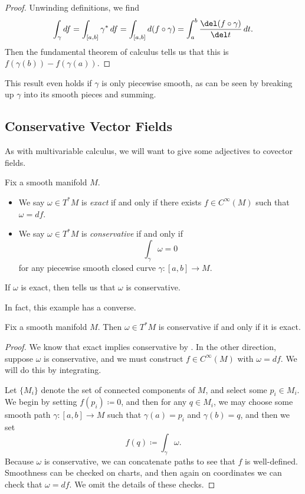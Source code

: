 \documentclass[../notes.tex]{subfiles}
\begin{document}
\begin{proof}
	Unwinding definitions, we find
	\[\int_\gamma df=\int_{[a,b]}\gamma^*\,df=\int_{[a,b]}d(f\circ\gamma)=\int_a^b\frac{\del(f\circ\gamma)}{\del t}\,dt.\]
	Then the fundamental theorem of calculus tells us that this is $f(\gamma(b))-f(\gamma(a))$.
\end{proof}
\begin{remark}
	This result even holds if $\gamma$ is only piecewise smooth, as can be seen by breaking up $\gamma$ into its smooth pieces and summing.
\end{remark}

\subsection{Conservative Vector Fields}
As with multivariable calculus, we will want to give some adjectives to covector fields.
\begin{defihelper}  
	Fix a smooth manifold $M$.
	\begin{itemize}
		\item We say $\omega\in T^*M$ is \textit{exact} if and only if there exists $f\in C^\infty(M)$ such that $\omega=df$.
		\item We say $\omega\in T^*M$ is \textit{conservative} if and only if
		\[\int_\gamma\omega=0\]
		for any piecewise smooth closed curve $\gamma\colon[a,b]\to M$.
	\end{itemize}
\end{defihelper}
\begin{example}
	If $\omega$ is exact, then  tells us that $\omega$ is conservative.
\end{example}
In fact, this example has a converse.
\begin{proposition}
	Fix a smooth manifold $M$. Then $\omega\in T^*M$ is conservative if and only if it is exact.
\end{proposition}
\begin{proof}
	We know that exact implies conservative by . In the other direction, suppose $\omega$ is conservative, and we must construct $f\in C^\infty(M)$ with $\omega=df$. We will do this by integrating.

	Let $\{M_i\}$ denote the set of connected components of $M$, and select some $p_i\in M_i$. We begin by setting $f(p_i)\coloneqq0$, and then for any $q\in M_i$, we may choose some smooth path $\gamma\colon[a,b]\to M$ such that $\gamma(a)=p_i$ and $\gamma(b)=q$, and then we set
	\[f(q)\coloneqq\int_\gamma\omega.\]
	Because $\omega$ is conservative, we can concatenate paths to see that $f$ is well-defined. Smoothness can be checked on charts, and then again on coordinates we can check that $\omega=df$. We omit the details of these checks.
\end{proof}
\end{document}
